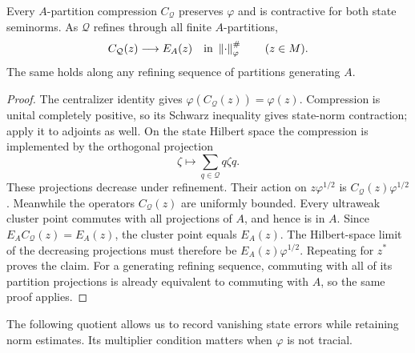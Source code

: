 \begin{lemma}\label{lem:compression-net}
Every \(A\)-partition compression \(C_{\mathcal Q}\) preserves
\(\varphi\) and is contractive for both state seminorms.
As \(\mathcal Q\) refines through all finite \(A\)-partitions,
\[
 C_{\mathcal Q}(z)\longrightarrow E_A(z)
 \quad\text{in }\left\lVert\cdot\right\rVert_\varphi^\#
 \qquad(z\in M).
\]
The same holds along any refining sequence of partitions generating \(A\).
\end{lemma}
\begin{proof}
The centralizer identity gives
\(\varphi(C_{\mathcal Q}(z))=\varphi(z)\).
Compression is unital completely positive, so its Schwarz inequality
gives state-norm contraction; apply it to adjoints as well.
On the state Hilbert space the compression is implemented by the
orthogonal projection
\[
 \zeta\longmapsto\sum_{q\in\mathcal Q}q\zeta q.
\]
These projections decrease under refinement. Their action on
\(z\varphi^{1/2}\) is
\(C_{\mathcal Q}(z)\varphi^{1/2}\).
Meanwhile the operators \(C_{\mathcal Q}(z)\) are uniformly bounded.
Every ultraweak cluster point commutes with all projections of \(A\),
and hence is in \(A\). Since
\(E_A C_{\mathcal Q}(z)=E_A(z)\), the cluster point equals \(E_A(z)\).
The Hilbert-space limit of the decreasing projections must therefore
be \(E_A(z)\varphi^{1/2}\).
Repeating for \(z^*\) proves the claim.
For a generating refining sequence, commuting with all of its
partition projections is already equivalent to commuting with \(A\),
so the same proof applies.
\end{proof}

The following quotient allows us to record vanishing state errors
while retaining norm estimates. Its multiplier condition matters
when \(\varphi\) is not tracial.

